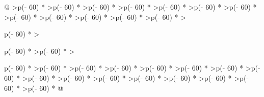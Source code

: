 \documentclass[
  letterpaper,
  DIV=11,
  numbers=noendperiod]{scrartcl}
\begin{document}
\begin{longtable}[]{@{}
  >{\raggedleft\arraybackslash}p{(\columnwidth - 60\tabcolsep) * }
  >{\raggedleft\arraybackslash}p{(\columnwidth - 60\tabcolsep) * }
  >{\raggedleft\arraybackslash}p{(\columnwidth - 60\tabcolsep) * }
  >{\raggedleft\arraybackslash}p{(\columnwidth - 60\tabcolsep) * }
  >{\raggedleft\arraybackslash}p{(\columnwidth - 60\tabcolsep) * }
  >{\raggedleft\arraybackslash}p{(\columnwidth - 60\tabcolsep) * }
  >{\raggedleft\arraybackslash}p{(\columnwidth - 60\tabcolsep) * }
  >{\raggedleft\arraybackslash}p{(\columnwidth - 60\tabcolsep) * }
  >{\raggedleft\arraybackslash}p{(\columnwidth - 60\tabcolsep) * }
  >{\raggedleft\arraybackslash}p{(\columnwidth - 60\tabcolsep) * }
  >{\raggedleft\arraybackslash}p{(\columnwidth - 60\tabcolsep) * }
  >{\raggedleft\arraybackslash}p{(\columnwidth - 60\tabcolsep) * }
  >{\raggedright\arraybackslash}p{(\columnwidth - 60\tabcolsep) * }
  >{\raggedright\arraybackslash}p{(\columnwidth - 60\tabcolsep) * }
  >{\raggedleft\arraybackslash}p{(\columnwidth - 60\tabcolsep) * }
  >{\raggedright\arraybackslash}p{(\columnwidth - 60\tabcolsep) * }
  >{\raggedleft\arraybackslash}p{(\columnwidth - 60\tabcolsep) * }
  >{\raggedleft\arraybackslash}p{(\columnwidth - 60\tabcolsep) * }
  >{\raggedleft\arraybackslash}p{(\columnwidth - 60\tabcolsep) * }
  >{\raggedleft\arraybackslash}p{(\columnwidth - 60\tabcolsep) * }
  >{\raggedleft\arraybackslash}p{(\columnwidth - 60\tabcolsep) * }
  >{\raggedleft\arraybackslash}p{(\columnwidth - 60\tabcolsep) * }
  >{\raggedleft\arraybackslash}p{(\columnwidth - 60\tabcolsep) * }
  >{\raggedleft\arraybackslash}p{(\columnwidth - 60\tabcolsep) * }
  >{\raggedleft\arraybackslash}p{(\columnwidth - 60\tabcolsep) * }
  >{\raggedleft\arraybackslash}p{(\columnwidth - 60\tabcolsep) * }
  >{\raggedleft\arraybackslash}p{(\columnwidth - 60\tabcolsep) * }
  >{\raggedleft\arraybackslash}p{(\columnwidth - 60\tabcolsep) * }
  >{\raggedleft\arraybackslash}p{(\columnwidth - 60\tabcolsep) * }
  >{\raggedleft\arraybackslash}p{(\columnwidth - 60\tabcolsep) * }
  >{\raggedleft\arraybackslash}p{(\columnwidth - 60\tabcolsep) * }@{}}
\toprule\noalign{}
\begin{minipage}[b]{\linewidth}\raggedleft

\end{minipage}
\end{longtable}
\end{document}
